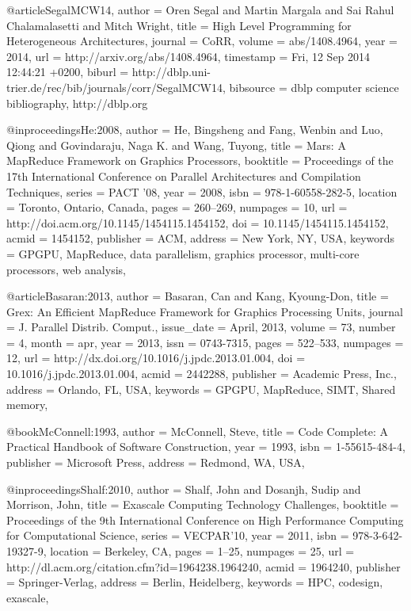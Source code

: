 @article{SegalMCW14,
  author    = {Oren Segal and
               Martin Margala and
               Sai Rahul Chalamalasetti and
               Mitch Wright},
  title     = {High Level Programming for Heterogeneous Architectures},
  journal   = {CoRR},
  volume    = {abs/1408.4964},
  year      = {2014},
  url       = {http://arxiv.org/abs/1408.4964},
  timestamp = {Fri, 12 Sep 2014 12:44:21 +0200},
  biburl    = {http://dblp.uni-trier.de/rec/bib/journals/corr/SegalMCW14},
  bibsource = {dblp computer science bibliography, http://dblp.org}
}

@inproceedings{He:2008,
 author = {He, Bingsheng and Fang, Wenbin and Luo, Qiong and Govindaraju, Naga K. and Wang, Tuyong},
 title = {Mars: A MapReduce Framework on Graphics Processors},
 booktitle = {Proceedings of the 17th International Conference on Parallel Architectures and Compilation Techniques},
 series = {PACT '08},
 year = {2008},
 isbn = {978-1-60558-282-5},
 location = {Toronto, Ontario, Canada},
 pages = {260--269},
 numpages = {10},
 url = {http://doi.acm.org/10.1145/1454115.1454152},
 doi = {10.1145/1454115.1454152},
 acmid = {1454152},
 publisher = {ACM},
 address = {New York, NY, USA},
 keywords = {GPGPU, MapReduce, data parallelism, graphics processor, multi-core processors, web analysis},
} 

@article{Basaran:2013,
 author = {Basaran, Can and Kang, Kyoung-Don},
 title = {Grex: An Efficient MapReduce Framework for Graphics Processing Units},
 journal = {J. Parallel Distrib. Comput.},
 issue_date = {April, 2013},
 volume = {73},
 number = {4},
 month = apr,
 year = {2013},
 issn = {0743-7315},
 pages = {522--533},
 numpages = {12},
 url = {http://dx.doi.org/10.1016/j.jpdc.2013.01.004},
 doi = {10.1016/j.jpdc.2013.01.004},
 acmid = {2442288},
 publisher = {Academic Press, Inc.},
 address = {Orlando, FL, USA},
 keywords = {GPGPU, MapReduce, SIMT, Shared memory},
} 


@book{McConnell:1993,
 author = {McConnell, Steve},
 title = {Code Complete: A Practical Handbook of Software Construction},
 year = {1993},
 isbn = {1-55615-484-4},
 publisher = {Microsoft Press},
 address = {Redmond, WA, USA},
} 

@inproceedings{Shalf:2010,
 author = {Shalf, John and Dosanjh, Sudip and Morrison, John},
 title = {Exascale Computing Technology Challenges},
 booktitle = {Proceedings of the 9th International Conference on High Performance Computing for Computational Science},
 series = {VECPAR'10},
 year = {2011},
 isbn = {978-3-642-19327-9},
 location = {Berkeley, CA},
 pages = {1--25},
 numpages = {25},
 url = {http://dl.acm.org/citation.cfm?id=1964238.1964240},
 acmid = {1964240},
 publisher = {Springer-Verlag},
 address = {Berlin, Heidelberg},
 keywords = {HPC, codesign, exascale},
} 

